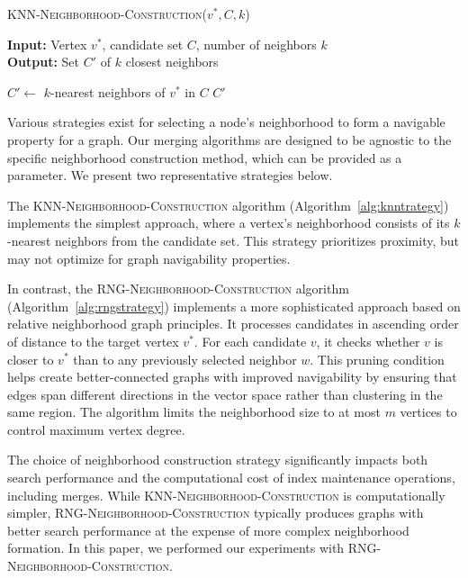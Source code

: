 \documentclass{article}
\begin{document}
\begin{algorithm}
\caption{\textsc{KNN-Neighborhood-Construction}($v^*, C, k$)}\label{alg:knntrategy}
\textbf{Input:} Vertex $v^*$, candidate set $C$, number of neighbors $k$ \\
\textbf{Output:} Set $C'$ of $k$ closest neighbors
\begin{algorithmic}[1]
\State $C' \gets$ $k$-nearest neighbors of $v^*$ in $C$
\State \Return $C'$
\end{algorithmic}
\end{algorithm}

Various strategies exist for selecting a node's neighborhood to form a navigable property for a graph. Our merging algorithms are designed to be agnostic to the specific neighborhood construction method, which can be provided as a parameter. We present two representative strategies below.

The \textsc{KNN-Neighborhood-Construction} algorithm (Algorithm~\ref{alg:knntrategy}) implements the simplest approach, where a vertex's neighborhood consists of its $k$-nearest neighbors from the candidate set. This strategy prioritizes proximity, but may not optimize for graph navigability properties.

In contrast, the \textsc{RNG-Neighborhood-Construction} algorithm (Algorithm~\ref{alg:rngstrategy}) implements a more sophisticated approach based on relative neighborhood graph principles. It processes candidates in ascending order of distance to the target vertex $v^*$. For each candidate $v$, it checks whether $v$ is closer to $v^*$ than to any previously selected neighbor $w$. This pruning condition helps create better-connected graphs with improved navigability by ensuring that edges span different directions in the vector space rather than clustering in the same region. The algorithm limits the neighborhood size to at most $m$ vertices to control maximum vertex degree.

The choice of neighborhood construction strategy significantly impacts both search performance and the computational cost of index maintenance operations, including merges. While \textsc{KNN-Neighborhood-Construction} is computationally simpler, \textsc{RNG-Neighborhood-Construction} typically produces graphs with better search performance at the expense of more complex neighborhood formation. In this paper, we performed our experiments with \textsc{RNG-Neighborhood-Construction}. 
\end{document}
